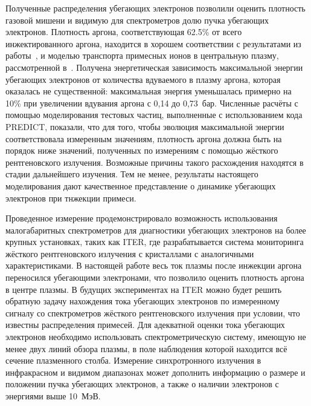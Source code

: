 Полученные распределения убегающих электронов позволили оценить плотность газовой мишени и видимую для спектрометров долю пучка убегающих электронов. Плотность аргона, соответствующая 62.5\% от всего инжектированного аргона, находится в хорошем соответствии с результатами из работы~\cite{Pautasso2020}, и моделью транспорта примесных ионов в центральную плазму, рассмотренной в~\cite{Linder2020}. Получена энергетическая зависимость максимальной энергии убегающих электронов от количества вдуваемого в плазму аргона, которая оказалась не существенной: максимальная энергия уменьшалась примерно на 10\% при увеличении вдувания аргона с 0,14 до 0,73~бар. Численные расчёты с помощью моделирования тестовых частиц, выполненные с использованием кода PREDICT, показали, что для того, чтобы эволюция максимальной энергии соответствовала измеренным значениям, плотность аргона должна быть на порядок ниже значений, полученных по измерениям с помощью жёсткого рентгеновского излучения. Возможные причины такого расхождения находятся в стадии дальнейшего изучения. Тем не менее, результаты настоящего моделирования дают качественное представление о динамике убегающих электронов при тнжекции примеси.

Проведенное измерение продемонстрировало возможность использования малогабаритных спектрометров для диагностики убегающих электронов на более крупных установках, таких как ITER, где разрабатывается система мониторинга жёсткого рентгеновского излучения с кристаллами с аналогичными характеристиками. В настоящей работе весь ток плазмы после инжекции аргона переносился убегающими электронами, что позволило оценить плотность аргона в центре плазмы. В будущих экспериментах на ITER можно будет решить обратную задачу нахождения тока убегающих электронов по измеренному сигналу со спектрометров жёсткого рентгеновского излучения при условии, что известны распределения примесей. Для адекватной оценки тока убегающих электронов необходимо использовать спектрометрическую систему, имеющую не менее двух линий обзора плазмы, в поле наблюдения которой находится всё сечение плазменного столба. Измерение синхротронного излучения в инфракрасном и видимом диапазонах может дополнить информацию о размере и положении пучка убегающих электронов, а также о наличии электронов с энергиями выше 10~МэВ.


\FloatBarrier
